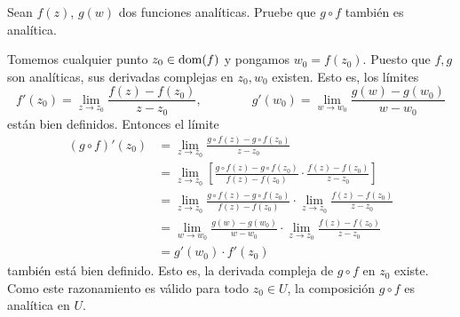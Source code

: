 \begin{exercise}
Sean $f(z)$, $g(w)$ dos funciones analíticas. Pruebe que $g \circ f$ también es analítica.
\end{exercise}

\begin{solution}
Tomemos cualquier punto $z_0 \in \operatorname{dom}(f)$ y pongamos $w_0 = f(z_0)$. Puesto que $f, g$ son analíticas, sus derivadas complejas en $z_0, w_0$ existen. Esto es, los límites
$$
f'(z_0) = \lim_{z \to z_0} \frac {f(z) - f(z_0)} {z - z_0}, \qquad \qquad
g'(w_0) = \lim_{w \to w_0} \frac {g(w) - g(w_0)} {w - w_0}
$$
están bien definidos. Entonces el límite
\begin{align*}
(g \circ f)'(z_0)
    & = \lim_{z \to z_0} \frac {g \circ f(z) - g \circ f(z_0)} {z - z_0} \\
    & = \lim_{z \to z_0} \left[
        \frac {g \circ f(z) - g \circ f(z_0)} {f(z) - f(z_0)} \cdot
        \frac {f(z) - f(z_0)} {z - z_0} \right] \\
    & = \lim_{z \to z_0} \frac {g \circ f(z) - g \circ f(z_0)} {f(z) - f(z_0)} \cdot
        \lim_{z \to z_0} \frac {f(z) - f(z_0)} {z - z_0} \\
    & = \lim_{w \to w_0} \frac {g(w) - g(w_0)} {w - w_0} \cdot
        \lim_{z \to z_0} \frac {f(z) - f(z_0)} {z - z_0} \\
    & = g'(w_0) \cdot f'(z_0)
\end{align*}
también está bien definido. Esto es, la derivada compleja de $g \circ f$ en $z_0$ existe. Como este razonamiento es válido para todo $z_0 \in U$, la composición $g \circ f$ es analítica en $U$.
\end{solution}
